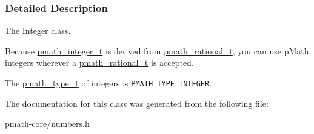 \subsubsection{Detailed Description}
The Integer class. 

Because \hyperlink{classpmath__integer__t}{pmath\_\-integer\_\-t} is derived from \hyperlink{classpmath__rational__t}{pmath\_\-rational\_\-t}, you can use pMath integers wherever a \hyperlink{classpmath__rational__t}{pmath\_\-rational\_\-t} is accepted.

The \hyperlink{group__objects_ge2646df76dcb0113715322b13a1f36f0}{pmath\_\-type\_\-t} of integers is {\tt PMATH\_\-TYPE\_\-INTEGER}. 

The documentation for this class was generated from the following file:\begin{CompactItemize}
\item 
pmath-core/numbers.h\end{CompactItemize}
